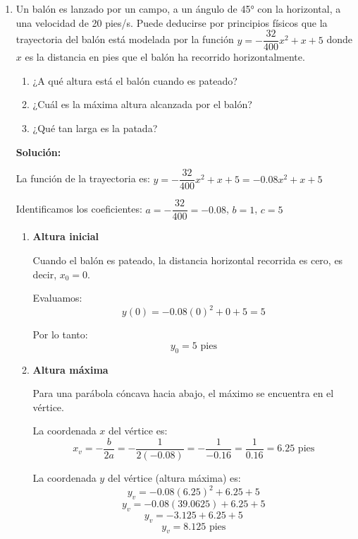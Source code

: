 \documentclass[12pt]{article}
\begin{document}
\begin{enumerate}[label=\alph*.-]
\begin{enumerate}[label=\roman*.]
        Sabemos que $K = C + 273$. Si $K = 0$:
        \[0 = C + 273\]
        \[C = -273\]
        
        Por lo tanto: \[\boxed{0K = -273C}\]
    \end{enumerate}
    
    \newpage
    
    \item Un balón es lanzado por un campo, a un ángulo de 45° con la horizontal, a una velocidad de 20 pies/s. Puede deducirse por principios físicos que la trayectoria del balón está modelada por la función $y = -\dfrac{32}{400}x^2 + x + 5$ donde $x$ es la distancia en pies que el balón ha recorrido horizontalmente.
    \begin{enumerate}[label=\roman*.]
        \item ¿A qué altura está el balón cuando es pateado?
        \item ¿Cuál es la máxima altura alcanzada por el balón?
        \item ¿Qué tan larga es la patada?
    \end{enumerate}
    
    \textbf{Solución:}
    
    La función de la trayectoria es: $y = -\dfrac{32}{400}x^2 + x + 5 = -0.08x^2 + x + 5$
    
    Identificamos los coeficientes: $a = -\dfrac{32}{400} = -0.08$, $b = 1$, $c = 5$
    
    \begin{enumerate}[label=\roman*.]
        \item \textbf{Altura inicial}
        
        Cuando el balón es pateado, la distancia horizontal recorrida es cero, es decir, $x_0 = 0$.
        
        Evaluamos:
        \[y(0) = -0.08(0)^2 + 0 + 5 = 5\]
        
        Por lo tanto: \[\boxed{y_0 = 5 \text{ pies}}\]
        
        \item \textbf{Altura máxima}
        
        Para una parábola cóncava hacia abajo, el máximo se encuentra en el vértice.
        
        La coordenada $x$ del vértice es:
        \[x_v = -\frac{b}{2a} = -\frac{1}{2(-0.08)} = -\frac{1}{-0.16} = \frac{1}{0.16} = 6.25 \text{ pies}\]
        
        La coordenada $y$ del vértice (altura máxima) es:
        \[y_v = -0.08(6.25)^2 + 6.25 + 5\]
        \[y_v = -0.08(39.0625) + 6.25 + 5\]
        \[y_v = -3.125 + 6.25 + 5\]
        \[y_v = 8.125 \text{ pies}\]
        

\end{enumerate}
\end{enumerate}
\end{document}
